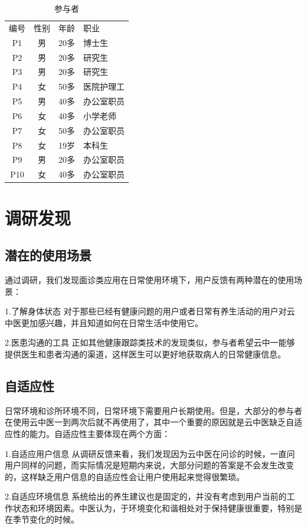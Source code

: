 \begin{table}
  \caption{参与者}
  \centering
  \label{tab:Participants}
  \begin{tabular}{cccl}
编号 &	性别 &	年龄 &	职业 \\
P1 &	男 &	20多 &	博士生 \\
P2 &	男 &	20多 &	研究生 \\
P3 &	男 &	20多 &	研究生 \\
P4 &	女 &	50多 &	医院护理工 \\
P5 &	男 &	40多 &	办公室职员 \\
P6 &	女 &	40多 &	小学老师 \\
P7 &	女 &	50多 &	办公室职员 \\
P8 &	女 &	19岁 &	本科生 \\
P9 &	男 &	20多 &	办公室职员 \\
P10 &	女 &	40多 &	办公室职员 \\
  \end{tabular}
\end{table}

\section{调研发现}
\subsection{潜在的使用场景}
通过调研，我们发现面诊类应用在日常使用环境下，用户反馈有两种潜在的使用场景：

1.了解身体状态
对于那些已经有健康问题的用户或者日常有养生活动的用户对云中医更加感兴趣，并且知道如何在日常生活中使用它。

2.医患沟通的工具
正如其他健康跟踪类技术的发现类似，参与者希望云中一能够提供医生和患者沟通的渠道，这样医生可以更好地获取病人的日常健康信息。

\subsection{自适应性}
日常环境和诊所环境不同，日常环境下需要用户长期使用。但是，大部分的参与者在使用云中医一到两次后就不再使用了，其中一个重要的原因就是云中医缺乏自适应性的能力。自适应性主要体现在两个方面：

1.自适应用户信息
从调研反馈来看，我们发现因为云中医在问诊的时候，一直问用户同样的问题，而实际情况是短期内来说，大部分问题的答案是不会发生改变的，这样缺乏用户信息的自适应性会让用户使用起来觉得很繁琐。

2.自适应环境信息
系统给出的养生建议也是固定的，并没有考虑到用户当前的工作状态和环境因素。中医认为，于环境变化和谐相处对于保持健康很重要，特别是在季节变化的时候。
